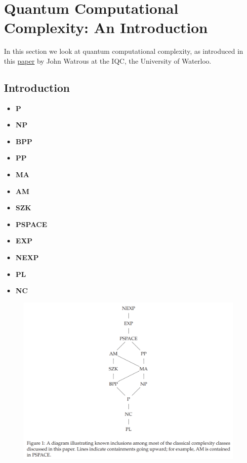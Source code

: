 \documentclass{book}
\theoremstyle{definition}
\begin{document}
\section{Quantum Computational Complexity: An Introduction}

In this section we look at quantum computational complexity, as introduced in this \href{https://arxiv.org/pdf/0804.3401v1.pdf}{\underline{paper}} by John Watrous at the IQC, the University of Waterloo.

\subsection{Introduction}

\begin{itemize}
	\item \textbf{P}
	
	\item \textbf{NP}
	
	
	\item \textbf{BPP}
	
	\item \textbf{PP}
	
	\item \textbf{MA}
	
	
	\item \textbf{AM}
	
	\item \textbf{SZK}
	
	\item \textbf{PSPACE}
	
	\item \textbf{EXP}
	
	\item \textbf{NEXP}
	
	
	\item  \textbf{PL}
	
	\item \textbf{NC}
\end{itemize}

\begin{figure}[!htb]
	\centering
	\includegraphics[scale=0.3]{complexity}
\end{figure}
\end{document}
